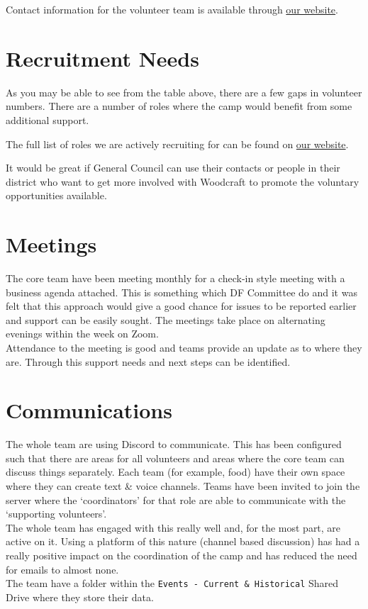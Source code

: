 Contact information for the volunteer team is available through \href{https://venturercamp.org.uk/contact/}{our website}.

\section{Recruitment Needs}
As you may be able to see from the table above, there are a few gaps in volunteer numbers. There are a number of roles where the camp would benefit from some additional support. 

The full list of roles we are actively recruiting for can be found on \href{https://venturercamp.org.uk/get-involved/}{our website}.

It would be great if General Council can use their contacts or people in their district who want to get more involved with Woodcraft to promote the voluntary opportunities available.

\section{Meetings}
The core team have been meeting monthly for a check-in style meeting with a business agenda attached. This is something which DF Committee do and it was felt that this approach would give a good chance for issues to be reported earlier and support can be easily sought. The meetings take place on alternating evenings within the week on Zoom.\\

Attendance to the meeting is good and teams provide an update as to where they are. Through this support needs and next steps can be identified.

\section{Communications}
The whole team are using Discord to communicate. This has been configured such that there are areas for all volunteers and areas where the core team can discuss things separately. Each team (for example, food) have their own space where they can create text \& voice channels. Teams have been invited to join the server where the `coordinators' for that role are able to communicate with the `supporting volunteers'. \\

The whole team has engaged with this really well and, for the most part, are active on it. Using a platform of this nature (channel based discussion) has had a really positive impact on the coordination of the camp and has reduced the need for emails to almost none.\\

The team have a folder within the \texttt{Events - Current \& Historical} Shared Drive where they store their data.\\